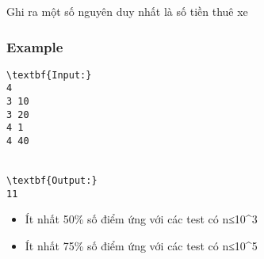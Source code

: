    Ghi ra một số nguyên duy nhất là số tiền thuê xe  

\subsubsection{   Example  }
\begin{verbatim}
\textbf{Input:}
4
3 10
3 20
4 1
4 40


\textbf{Output:}
11 \end{verbatim}
\begin{itemize}
	\item     Ít nhất 50\% số điểm ứng với các test có n≤10^3   
	\item     Ít nhất 75\% số điểm ứng với các test có n≤10^5   
\end{itemize}

